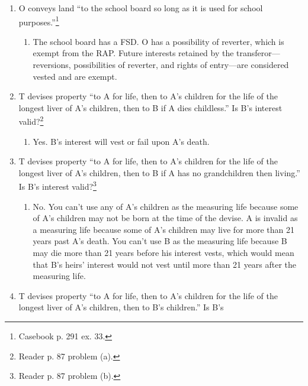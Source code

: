\begin{enumerate}
{    problem 4). See reader p. 74.}
    \begin{enumerate}
        \item Yes. B has a vested remainder in fee simple absolute. The RAP 
        only applies to non-vested interests.
    \end{enumerate}
    \item O conveys land ``to the school board so long as it is used for 
    school purposes.''\footnote{Casebook p. 291 ex. 33.}
    \begin{enumerate}
        \item The school board has a FSD. O has a possibility of reverter, 
        which is exempt from the RAP. Future interests retained by the 
        transferor---reversions, possibilities of reverter, and rights of 
        entry---are considered vested and are exempt.
    \end{enumerate}
    \item T devises property ``to A for life, then to A's children for the 
    life of the longest liver of A's children, then to B if A dies 
    childless.'' Is B's interest valid?\footnote{Reader p. 87 problem (a).}
    \begin{enumerate}
        \item Yes. B's interest will vest or fail upon A's death.
    \end{enumerate}
    \item T devises property ``to A for life, then to A's children for the 
    life of the longest liver of A's children, then to B if A has no 
    grandchildren then living.'' Is B's interest valid?\footnote{Reader p. 87 
    problem (b).}
    \begin{enumerate}
        \item No. You can't use any of A's children as the measuring life 
        because some of A's children may not be born at the time of the 
        devise. A is invalid as a measuring life because some of A's children 
        may live for more than 21 years past A's death. You can't use B as the 
        measuring life because B may die more than 21 years before his 
        interest vests, which would mean that B's heirs' interest would not 
        vest until more than 21 years after the measuring life.
    \end{enumerate}
    \item T devises property ``to A for life, then to A's children for the 
    life of the longest liver of A's children, then to B's children.'' Is B's 

\end{enumerate}

